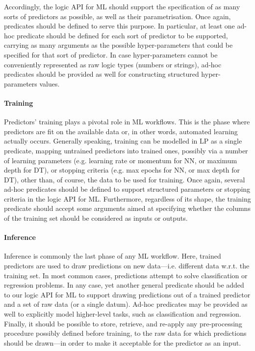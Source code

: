 \documentclass{article}
\begin{document}
Accordingly, the logic API for ML should support the specification of as many sorts of predictors as possible, as well as their parametrisation.
%
Once again, predicates should be defined to serve this purpose.
%
In particular, at least one ad-hoc predicate should be defined for each sort of predictor to be supported, carrying as many arguments as the possible hyper-parameters that could be specified for that sort of predictor.
%
In case hyper-parameters cannot be conveniently represented as raw logic types (numbers or strings), ad-hoc predicates should be provided as well for constructing structured hyper-parameters values.


\paragraph{Training}
%
Predictors' training plays a pivotal role in ML workflows.
%
This is the phase where predictors are fit on the available data or, in other words, automated learning actually occurs.
%
Generally speaking, training can be modelled in LP as a single predicate, mapping untrained predictors into trained ones, possibly via a number of learning parameters (e.g. learning rate or momentum for NN, or maximum depth for DT), or stopping criteria (e.g. max epochs for NN, or max depth for DT), other than, of course, the data to be used for training.
%
Once again, several ad-hoc predicates should be defined to support structured parameters or stopping criteria in the logic API for ML.
%
Furthermore, regardless of its shape, the training predicate should accept some arguments aimed at specifying whether the columns of the training set should be considered as inputs or outputs.

\paragraph{Inference}
%
Inference is commonly the last phase of any ML workflow.
%
Here, trained predictors are used to draw predictions on new data---i.e. different data w.r.t. the training set.
%
%
In most common cases, predictions attempt to solve classification or regression problems.
%
In any case, yet another general predicate should be added to our logic API for ML to support drawing predictions out of a trained predictor and a set of raw data (or a single datum).
%
Ad-hoc predicates may be provided as well to explicitly model higher-level tasks, such as classification and regression.
%
Finally, it should be possible to store, retrieve, and re-apply any pre-processing procedure possibly defined before training, to the raw data for which predictions should be drawn---in order to make it acceptable for the predictor as an input.
\end{document}
